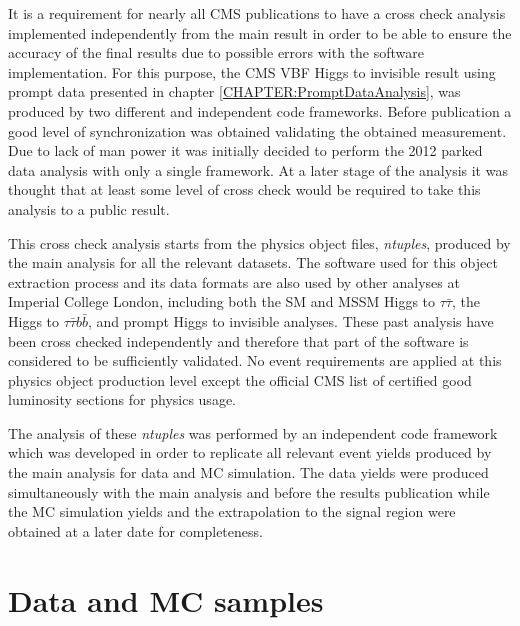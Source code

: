 It is a requirement for nearly all \gls{CMS} publications to have a cross check analysis implemented independently from the main result in order to be able to ensure the accuracy of the final results due to possible errors with the software implementation. For this purpose, the \gls{CMS} \gls{VBF} Higgs to invisible result using prompt data presented in chapter \ref{CHAPTER:PromptDataAnalysis}, was produced by two different and independent code frameworks. Before publication a good level of synchronization was obtained validating the obtained measurement. Due to lack of man power it was initially decided to perform the 2012 parked data analysis with only a single framework. At a later stage of the analysis it was thought that at least some level of cross check would be required to take this analysis to a public result.
 
This cross check analysis starts from the physics object files, \textit{ntuples}, produced by the main analysis for all the relevant datasets. The software used for this object extraction process and its data formats are also used by other analyses at Imperial College London, including both the \gls{SM} and \gls{MSSM} Higgs to $\tau\bar{\tau}$, the Higgs to $\tau\bar{\tau}b\bar{b}$, and prompt Higgs to invisible analyses. These past analysis have been cross checked independently and therefore that part of the software is considered to be sufficiently validated. No event requirements are applied at this physics object production level except the official \gls{CMS} list of certified good luminosity sections for physics usage.
 
The analysis of these \textit{ntuples} was performed by an independent code framework which was developed in order to replicate all relevant event yields produced by the main analysis for data and \gls{MC} simulation. The data yields were produced simultaneously with the main analysis and before the results publication while the \gls{MC} simulation yields and the extrapolation to the signal region were obtained at a later date for completeness. 

\section{Data and MC samples}


